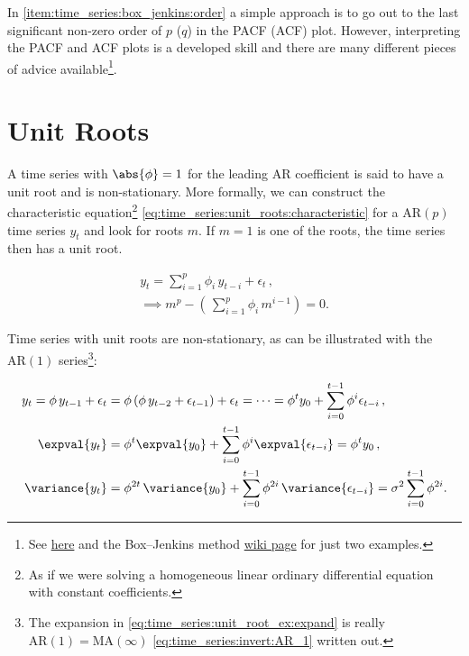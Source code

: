 In \cref{item:time_series:box_jenkins:order} a simple approach is to
go out to the last significant non-zero order of $p$ ($q$) in the PACF (ACF) plot.
However, interpreting the PACF and ACF plots is a developed skill
and there are many different pieces of advice
available\footnote{See
\href{https://people.duke.edu/~rnau/411arim3.htm}{here}
and the Box--Jenkins method
\href{https://en.wikipedia.org/wiki/Box\%E2\%80\%93Jenkins\_method\#Autocorrelation\_and\_partial\_autocorrelation\_plots}{wiki page}
for just two examples.}.

\section{Unit Roots}
\label{time_series:unit_root}

A time series with $\abs{\phi} = 1$ for the leading AR coefficient
is said to have a unit root and is non-stationary.
More formally, we can construct the characteristic
equation\footnote{As if we were solving a
homogeneous linear ordinary differential equation with constant coefficients.} \cref{eq:time_series:unit_roots:characteristic}
for a $\text{AR}\left(p\right)$ time series $y_{t}$ and look for roots $m$.
If $m=1$ is one of the roots, the time series then has a unit root.

\begin{subequations}\label{eq:time_series:unit_roots}
\begin{gather}
y_{t} = \sum_{i=1}^{p} \phi_{i}\, y_{t-i} + \epsilon_{t}\,, \label{eq:time_series:unit_roots:y} \\
\implies m^{p} - \left(\, \sum_{i=1}^{p} \phi_{i}\, m^{i-1} \right) = 0. \label{eq:time_series:unit_roots:characteristic}
\end{gather}
\end{subequations}

Time series with unit roots are non-stationary,
as can be illustrated with the $\text{AR}\left(1\right)$ series\footnote{The expansion
in \cref{eq:time_series:unit_root_ex:expand} is really
$\text{AR}\left(1\right) = \text{MA}\left(\infty\right)$ \cref{eq:time_series:invert:AR_1} written out.}:

\begin{subequations}\label{eq:time_series:unit_root_ex}
\begin{align}
y_{t}
= \phi\, y_{t-1} + \epsilon_{t}
&= \phi \left(\phi\, y_{t-2} + \epsilon_{t-1}\right) + \epsilon_{t}
= \cdots
= \phi^{t} y_{0} + \sum_{i=0}^{t-1} \phi^{i} \epsilon_{t-i}\,, \label{eq:time_series:unit_root_ex:expand} \\
\expval{y_{t}}
&= \phi^{t} \expval{y_{0}} + \sum_{i=0}^{t-1} \phi^{i} \expval{\epsilon_{t-i}}
= \phi^{t} y_{0}\,, \label{eq:time_series:unit_root_ex:expval} \\
\variance{y_{t}}
&= \phi^{2t}\, \variance{y_{0}} + \sum_{i=0}^{t-1} \phi^{2i}\, \variance{\epsilon_{t-i}}
= \sigma^{2} \sum_{i=0}^{t-1} \phi^{2i}. \label{eq:time_series:unit_root_ex:var}
\end{align}
\end{subequations}

